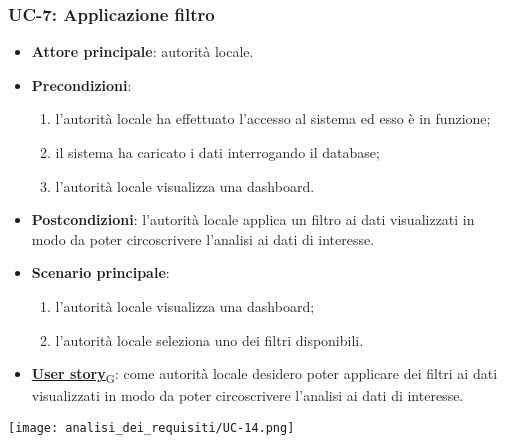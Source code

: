 \subsubsection{UC-7: Applicazione filtro}
\begin{itemize}
	\item \textbf{Attore principale}: autorità locale.
	\item \textbf{Precondizioni}:
	      \begin{enumerate}
		      \item l'autorità locale ha effettuato l'accesso al sistema ed esso è in funzione;
		      \item il sistema ha caricato i dati interrogando il database;
		      \item l'autorità locale visualizza una dashboard.
	      \end{enumerate}
	\item \textbf{Postcondizioni}: l'autorità locale applica un filtro ai dati visualizzati in modo da poter circoscrivere l'analisi ai dati di interesse.
	\item \textbf{Scenario principale}:
	      \begin{enumerate}
		      \item l'autorità locale visualizza una dashboard;
		      \item l'autorità locale seleziona uno dei filtri disponibili.
	      \end{enumerate}
	\item \href{https://7last.github.io/docs/pb/documentazione-interna/glossario\#user-story}{\textbf{User story}\textsubscript{G}}:
	      come autorità locale desidero poter applicare dei filtri ai dati visualizzati in modo da poter circoscrivere l'analisi ai dati di interesse.
\end{itemize}
\begin{center}
	\texttt{[image: analisi\_dei\_requisiti/UC-14.png]}
\end{center}

